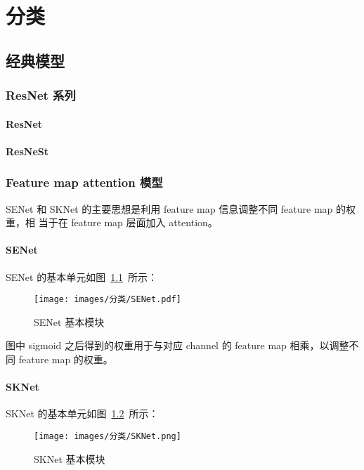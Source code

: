 \part{分类}

\chapter{经典模型}

\section{ResNet 系列}

\subsection{ResNet}
\label{subsec:ResNet}

\subsection{ResNeSt}

\section{Feature map attention 模型}
SENet 和 SKNet 的主要思想是利用 feature map 信息调整不同 feature map 的权重，相
当于在 feature map 层面加入 attention。

\subsection{SENet}
\label{subsec:SENet}
SENet 的基本单元如图~\ref{fig:senet}~所示：

\begin{figure}[ht]
  \centering
  \texttt{[image: images/分类/SENet.pdf]}
  \caption{SENet 基本模块}
  \label{fig:senet}
\end{figure}

图中 sigmoid 之后得到的权重用于与对应 channel 的 feature map 相乘，以调整不
同 feature map 的权重。

\subsection{SKNet}
SKNet 的基本单元如图~\ref{fig:sknet}~所示：

\begin{figure}[ht]
  \centering
  \texttt{[image: images/分类/SKNet.png]}
  \caption{SKNet 基本模块}
  \label{fig:sknet}
\end{figure}

